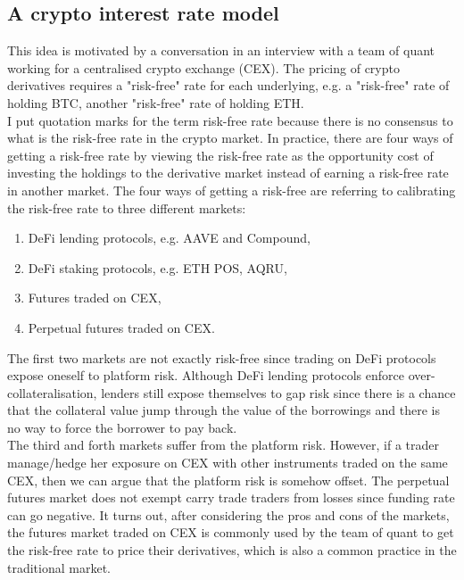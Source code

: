 \documentclass[square]{article} %
\theoremstyle{plain}
\theoremstyle{definition} %
\begin{document}
\subsection{A crypto interest rate model}
This idea is motivated by a conversation in an interview with a team of quant working for a centralised crypto exchange (CEX).
 The pricing of crypto derivatives requires a "risk-free" rate for each underlying,
 e.g. a "risk-free" rate of holding BTC, another "risk-free" rate of holding ETH. \\
 
I put quotation marks for the term risk-free rate because there is no consensus to what is the risk-free rate in the crypto market. 
 In practice, there are four ways of getting a risk-free rate by viewing the risk-free rate as the opportunity cost of investing the 
 holdings to the derivative market instead of earning a risk-free rate in another market. 
 The four ways of getting a risk-free are referring to calibrating the risk-free rate to three different markets:
 \begin{enumerate}
  \item DeFi lending protocols, e.g. AAVE and Compound,
  \item DeFi staking protocols, e.g. ETH POS, AQRU,
  \item Futures traded on CEX,
  \item Perpetual futures traded on CEX.
 \end{enumerate} 

The first two markets are not exactly risk-free since trading on DeFi protocols expose oneself to platform risk.
 Although DeFi lending protocols enforce over-collateralisation, 
 lenders still expose themselves to gap risk since there is a chance that the collateral value jump through the value of the borrowings and there is no way to force the borrower to pay back.\\ 

The third and forth markets suffer from the platform risk. 
 However, if a trader manage/hedge her exposure on CEX with other instruments traded on the same CEX, 
 then we can argue that the platform risk is somehow offset. 
 The perpetual futures market does not exempt carry trade traders from losses since funding rate can go negative. 
 It turns out, after considering the pros and cons of the markets, 
 the futures market traded on CEX is commonly used by the team of quant to get the risk-free rate to price their derivatives, which is also a common practice in the traditional market.  \\
\end{document}

